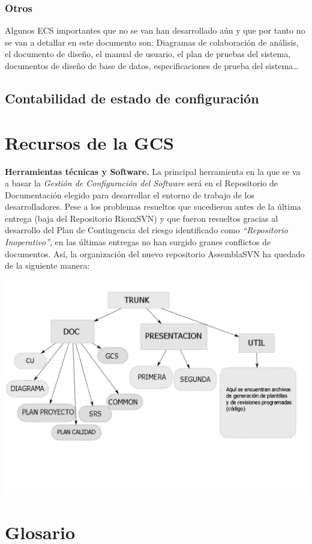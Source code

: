 \documentclass[11pt, a4paper, twoside, titlepage]{article}
\begin{document}
			\subsubsection{Otros}
				Algunos ECS importantes que no se van han desarrollado aún y que por tanto no se van a detallar en este documento son: Diagramas de colaboración de análisis, el documento de diseño, el manual de usuario, el plan de pruebas del sistema, documentos de diseño de base de datos, especificaciones de prueba del sistema\ldots

		\subsection{Contabilidad de estado de configuración} %
	\section{Recursos de la GCS} %
		\textbf{Herramientas técnicas y Software.}
			La principal herramienta en la que se va a basar la \textit{Gestión de Configuración del Software} será en el Repositorio de Documentación elegido para desarrollar el entorno de trabajo de los desarrolladores. Pese a los problemas resueltos que sucedieron antes de la última entrega (baja del Repositorio RiouxSVN) y que fueron resueltos gracias al desarrollo del Plan de Contingencia del riesgo identificado como \textit{"`Repositorio Inoperativo"'}, en las últimas entregas no han surgido granes conflictos de documentos. Así, la organización del nuevo repositorio AssemblaSVN ha quedado de la siguiente manera: \\
			\begin{center}
				\includegraphics[scale=.4]{repositorio.png}
			\end{center}

	\section{Glosario}
		\printglossaries

	\newpage
	
	
\end{document}
